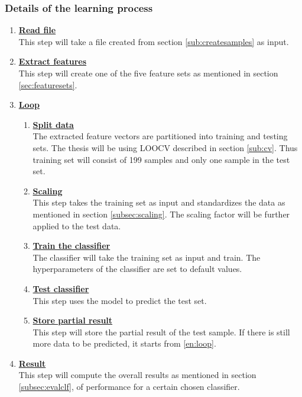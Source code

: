 \documentclass[USenglish]{ifimaster}  %
\begin{document}
\subsubsection{Details of the learning process} \label{sub:learningprocess}
\begin{enumerate}
\item \textbf{\underline{Read file}}
\\
This step will take a file created from section \ref{sub:createsamples} as input.
		
\item \textbf{\underline{Extract features}}
\\
This step will create one of the five feature sets as mentioned in section \ref{sec:featuresets}.
		
\item \textbf{\underline{Loop}}
		
\begin{enumerate} 
\item \textbf{\underline{Split data}} \label{en:loop}
\\
The extracted feature vectors are partitioned into training and testing sets. The thesis will be using LOOCV described in section \ref{sub:cv}. Thus training set will consist of 199 samples and only one sample in the test set.
			
\item \textbf{\underline{Scaling}}
\\
This step takes the training set as input and standardizes the data as mentioned in section \ref{subsec:scaling}. The scaling factor will be further applied to the test data.
			
\item \textbf{\underline{Train the classifier}}
\\
The classifier will take the training set as input and train. The hyperparameters of the classifier are set to default values. 
			
\item \textbf{\underline{Test classifier}} 
\\
This step uses the model to predict the test set.

\item \textbf{\underline{Store partial result}} 
\\
This step will store the partial result of the test sample. If there is still more data to be predicted, it starts from \ref{en:loop}.
\end{enumerate}	
		
\item \textbf{\underline{Result}}
\\
This step will compute the overall results as mentioned in section \ref{subsec:evalclf}, of performance for a certain chosen classifier. 
\end{enumerate}
	
\end{document}
